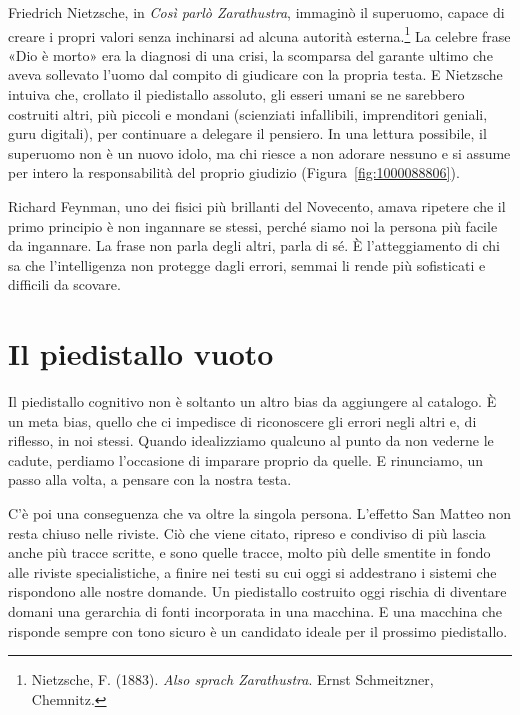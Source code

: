 Friedrich Nietzsche, in \textit{Cos\`{i} parl\`{o} Zarathustra}, immagin\`{o} il superuomo, capace di creare i propri valori senza inchinarsi ad alcuna autorit\`{a} esterna.\footnote{Nietzsche, F. (1883). \textit{Also sprach Zarathustra}. Ernst Schmeitzner, Chemnitz.} La celebre frase «Dio \`{e} morto» era la diagnosi di una crisi, la scomparsa del garante ultimo che aveva sollevato l'uomo dal compito di giudicare con la propria testa. E Nietzsche intuiva che, crollato il piedistallo assoluto, gli esseri umani se ne sarebbero costruiti altri, pi\`{u} piccoli e mondani (scienziati infallibili, imprenditori geniali, guru digitali), per continuare a delegare il pensiero. In una lettura possibile, il superuomo non \`{e} un nuovo idolo, ma chi riesce a non adorare nessuno e si assume per intero la responsabilit\`{a} del proprio giudizio (Figura~\ref{fig:1000088806}).


Richard Feynman, uno dei fisici pi\`{u} brillanti del Novecento, amava ripetere che il primo principio \`{e} non ingannare se stessi, perch\'{e} siamo noi la persona pi\`{u} facile da ingannare. La frase non parla degli altri, parla di s\'{e}. \`{E} l'atteggiamento di chi sa che l'intelligenza non protegge dagli errori, semmai li rende pi\`{u} sofisticati e difficili da scovare.

\section{Il piedistallo vuoto}

Il piedistallo cognitivo non \`{e} soltanto un altro bias da aggiungere al catalogo. \`{E} un meta bias, quello che ci impedisce di riconoscere gli errori negli altri e, di riflesso, in noi stessi. Quando idealizziamo qualcuno al punto da non vederne le cadute, perdiamo l'occasione di imparare proprio da quelle. E rinunciamo, un passo alla volta, a pensare con la nostra testa.

C'è poi una conseguenza che va oltre la singola persona. L'effetto San Matteo non resta chiuso nelle riviste. Ciò che viene citato, ripreso e condiviso di più lascia anche più tracce scritte, e sono quelle tracce, molto più delle smentite in fondo alle riviste specialistiche, a finire nei testi su cui oggi si addestrano i sistemi che rispondono alle nostre domande. Un piedistallo costruito oggi rischia di diventare domani una gerarchia di fonti incorporata in una macchina. E una macchina che risponde sempre con tono sicuro è un candidato ideale per il prossimo piedistallo.

